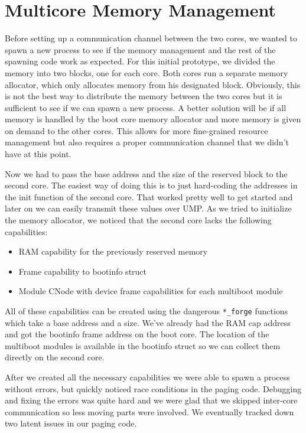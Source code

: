 \section{Multicore Memory Management}

Before setting up a communication channel between the two cores, we wanted to spawn a new process to see if the 
memory management and the rest of the spawning code work as expected. For this initial prototype, we divided 
the memory into two blocks, one for each core. Both cores run a separate memory allocator, which only allocates 
memory from his designated block. Obviously, this is not the best way to distribute the memory between the two 
cores but it is sufficient to see if we can spawn a new process. A better solution will be if all memory is 
handled by the boot core memory allocator and more memory is given on demand to the other cores. This allows 
for more fine-grained resource management but also requires a proper communication channel that we didn't have 
at this point.

Now we had to pass the base address and the size of the reserved block to the second core. The easiest way of 
doing this is to just hard-coding the addresses in the init function of the second core. That worked pretty well 
to get started and later on we can easily transmit these values over UMP. As we tried to initialize the memory 
allocator, we noticed that the second core lacks the following capabilities: 
\begin{itemize}
    \item RAM capability for the previously reserved memory
    \item Frame capability to bootinfo struct
    \item Module CNode with device frame capabilities for each multiboot module
\end{itemize}
All of these capabilities can be created using the dangerous \verb|*_forge| functions which take a base address 
and a size. We've already had the RAM cap address and got the bootinfo frame address on the boot core. The 
location of the multiboot modules is available in the bootinfo struct so we can collect them directly on the 
second core.

After we created all the necessary capabilities we were able to spawn a process without errors, but quickly 
noticed race conditions in the paging code. Debugging and fixing the errors was quite hard and we were glad that 
we skipped inter-core communication so less moving parts were involved. We eventually tracked down two latent 
issues in our paging code.

